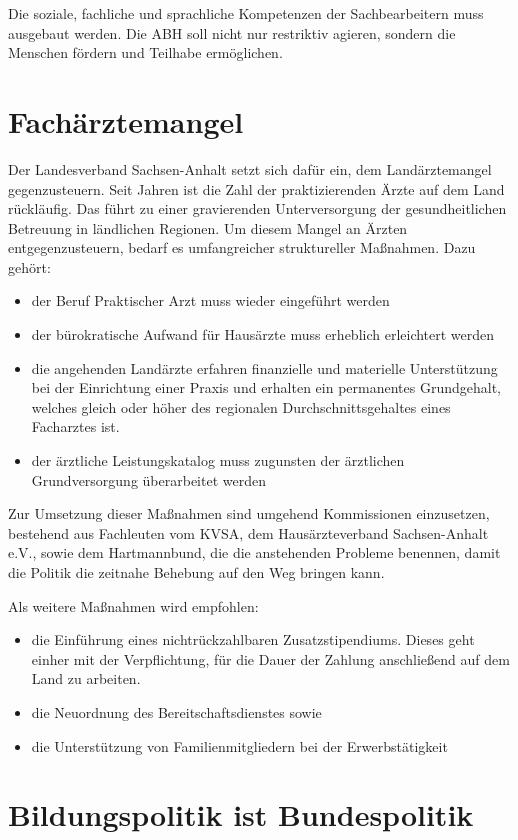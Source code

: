 Die soziale, fachliche und sprachliche Kompetenzen der Sachbearbeitern muss
ausgebaut werden. Die ABH soll nicht nur restriktiv agieren, sondern die
Menschen fördern und Teilhabe ermöglichen.

\section{Fachärztemangel}

Der Landesverband Sachsen-Anhalt setzt sich dafür ein, dem Landärztemangel
gegenzusteuern. Seit Jahren ist die Zahl der praktizierenden Ärzte auf dem Land
rückläufig. Das führt zu einer gravierenden Unterversorgung der gesundheitlichen
Betreuung in ländlichen Regionen. Um diesem Mangel an Ärzten entgegenzusteuern,
bedarf es umfangreicher struktureller Maßnahmen. Dazu gehört:
\begin{itemize}
\item der Beruf Praktischer Arzt muss wieder eingeführt werden
\item der bürokratische Aufwand für Hausärzte muss erheblich erleichtert werden
\item die angehenden Landärzte erfahren finanzielle und materielle Unterstützung
bei der Einrichtung einer Praxis und erhalten ein permanentes Grundgehalt,
welches gleich oder höher des regionalen Durchschnittsgehaltes eines Facharztes
ist.
\item der ärztliche Leistungskatalog muss zugunsten der ärztlichen
Grundversorgung überarbeitet werden
\end{itemize}
Zur Umsetzung dieser Maßnahmen sind umgehend Kommissionen einzusetzen,
bestehend aus Fachleuten vom KVSA, dem Hausärzteverband Sachsen-Anhalt e.V.,
sowie dem Hartmannbund, die die anstehenden Probleme benennen, damit die Politik
die zeitnahe Behebung auf den Weg bringen kann.

Als weitere Maßnahmen wird empfohlen:
\begin{itemize}
\item die Einführung eines nichtrückzahlbaren Zusatzstipendiums. Dieses geht
einher mit der Verpflichtung, für die Dauer der Zahlung anschließend auf dem
Land zu arbeiten.
\item die Neuordnung des Bereitschaftsdienstes sowie
\item die Unterstützung von Familienmitgliedern bei der Erwerbstätigkeit 
\end{itemize}

\section{Bildungspolitik ist Bundespolitik}

